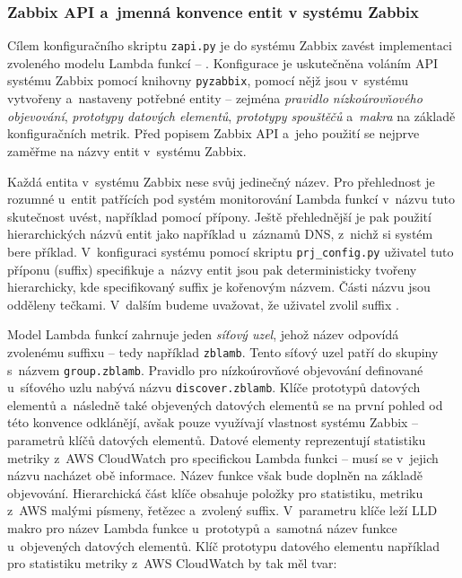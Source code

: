 \documentclass[czech, ing, kiv, he, iso690]{fasthesis}
\begin{document}
\subsubsection{Zabbix API a~jmenná konvence entit v systému Zabbix}

Cílem konfiguračního skriptu \verb|zapi.py| je do systému Zabbix zavést implementaci zvoleného modelu Lambda funkcí -- . Konfigurace je uskutečněna voláním API systému Zabbix pomocí knihovny \verb|pyzabbix|, pomocí nějž jsou v~systému vytvořeny a~nastaveny potřebné entity -- zejména \emph{pravidlo nízkoúrovňového objevování}, \emph{prototypy datových elementů}, \emph{prototypy spouštěčů} a~\emph{makra} na základě konfiguračních metrik. Před popisem Zabbix API a~jeho použití se nejprve zaměřme na názvy entit v~systému Zabbix.

Každá entita v~systému Zabbix nese svůj jedinečný název. Pro přehlednost je rozumné u~entit patřících pod systém monitorování Lambda funkcí v~názvu tuto skutečnost uvést, například pomocí přípony. Ještě přehlednější je pak použití hierarchických názvů entit jako například u~záznamů DNS, z~nichž si systém bere příklad. V~konfiguraci systému pomocí skriptu \verb|prj_config.py| uživatel tuto příponu (suffix) specifikuje a~názvy entit jsou pak deterministicky tvořeny hierarchicky, kde specifikovaný suffix je kořenovým názvem. Části názvu jsou odděleny tečkami. V~dalším budeme uvažovat, že uživatel zvolil suffix . 

Model Lambda funkcí zahrnuje jeden \emph{síťový uzel}, jehož název odpovídá zvolenému suffixu -- tedy například \verb|zblamb|. Tento síťový uzel patří do skupiny s~názvem \verb|group.zblamb|. Pravidlo pro nízkoúrovňové objevování definované u~síťového uzlu nabývá názvu \verb|discover.zblamb|. Klíče prototypů datových elementů a~následně také objevených datových elementů se na první pohled od této konvence odklánějí, avšak pouze využívají vlastnost systému Zabbix -- parametrů klíčů datových elementů. Datové elementy reprezentují statistiku metriky z~AWS CloudWatch pro specifickou Lambda funkci -- musí se v~jejich názvu nacházet obě informace. Název funkce však bude doplněn na základě objevování. Hierarchická část klíče obsahuje položky pro statistiku, metriku z~AWS malými písmeny, řetězec  a~zvolený suffix. V~parametru klíče leží LLD makro pro název Lambda funkce u~prototypů a~samotná název funkce u~objevených datových elementů. Klíč prototypu datového elementu například pro statistiku  metriky  z~AWS CloudWatch by tak měl tvar:
\end{document}
